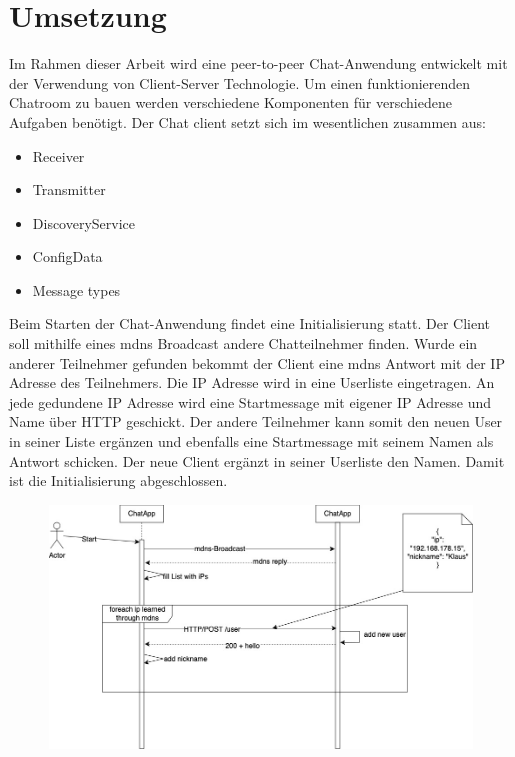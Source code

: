 \section{Umsetzung}
Im Rahmen dieser Arbeit wird eine peer-to-peer Chat-Anwendung entwickelt mit der Verwendung von Client-Server Technologie.
Um einen funktionierenden Chatroom zu bauen werden verschiedene Komponenten für verschiedene Aufgaben benötigt. 
Der Chat client setzt sich im wesentlichen zusammen aus:
\begin{itemize}
    \item Receiver
    \item Transmitter
    \item DiscoveryService
    \item ConfigData
    \item Message types
\end{itemize} 
Beim Starten der Chat-Anwendung findet eine Initialisierung statt. Der Client soll mithilfe eines mdns Broadcast andere Chatteilnehmer finden.
Wurde ein anderer Teilnehmer gefunden bekommt der Client eine mdns Antwort mit der IP Adresse des Teilnehmers.
Die IP Adresse wird in eine Userliste eingetragen. 
An jede gedundene IP Adresse wird eine Startmessage mit eigener IP Adresse und Name über HTTP geschickt. Der andere Teilnehmer kann somit den neuen 
User in seiner Liste ergänzen und ebenfalls eine Startmessage mit seinem Namen als Antwort schicken. Der neue Client ergänzt in seiner Userliste 
den Namen. Damit ist die Initialisierung abgeschlossen. 
\begin{figure}[ht]
    \centering
    \includegraphics[scale=0.4]{Images/Initialisierung_Sequenzdiagramm.jpg}
\end{figure}
